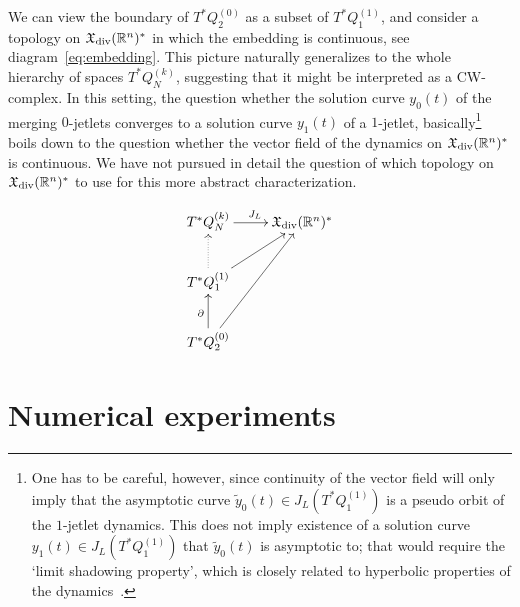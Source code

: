 \documentclass[12pt]{amsart}
\newcommand{\R}{\ensuremath{\mathbb{R}}}
\begin{document}
We can view the boundary of $T^*Q_2^{(0)}$ as a subset of $T^*Q_1^{(1)}$,
and consider a topology on $\mathfrak{X}_{\rm div}(\mathbb{R}^n)^*$ in which
the embedding is continuous,
see diagram~\eqref{eq:embedding}.
This picture naturally generalizes to the whole hierarchy of spaces
$T^*Q_N^{(k)}$, suggesting that it might be interpreted as a
CW-complex. In this setting, the question whether the solution curve
$y_0(t)$ of the merging $0$-jetlets converges to a solution curve
$y_1(t)$ of a $1$-jetlet, basically\footnote{%
  One has to be careful, however, since continuity of the vector field will
  only imply that the asymptotic curve $\tilde{y}_0(t) \in J_L(T^*Q_1^{(1)})$
  is a pseudo orbit of the $1$-jetlet dynamics. This does not imply
  existence of a solution curve $y_1(t) \in J_L(T^*Q_1^{(1)})$ that
  $\tilde{y}_0(t)$ is asymptotic to; that would require the `limit
  shadowing property', which is closely related to hyperbolic
  properties of the dynamics~\cite{Palmer2012,Ribeiro2014}.%
} boils down to the question whether the vector field of the dynamics
on $\mathfrak{X}_{\rm div}(\R^n)^*$ is continuous.
We have not pursued in detail the question of which topology on
$\mathfrak{X}_{\rm div}(\R^n)^*$ to use for this more abstract
characterization.


\begin{equation} \label{eq:embedding}
   \xymatrix{
     T^*Q_N^{(k)} \ar[r]^{J_L} & \mathfrak{X}_{\rm div}(\R^n)^* \\
     T^*Q_1^{(1)} \ar[ur] \ar@{.>}[u] \\
     T^*Q_2^{(0)} \ar[uur] \ar[u]^{\partial}
   }
\end{equation}


\section{Numerical experiments}
\label{sec:Numerical experiments}
\end{document}
